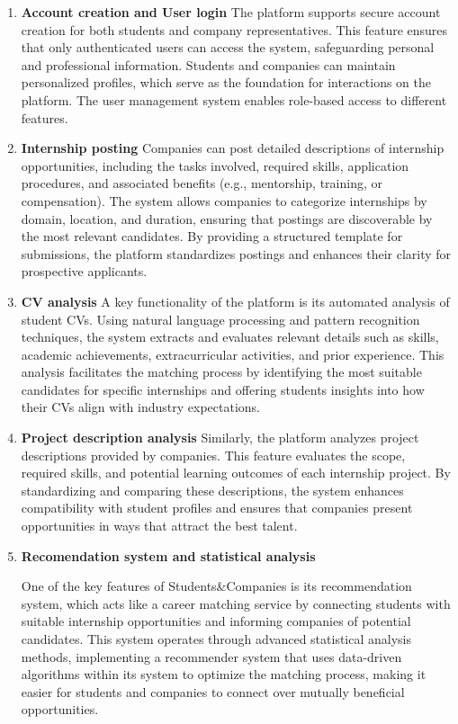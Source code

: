 \begin{enumerate}

\item \textbf{Account creation and User login}
The platform supports secure account creation for both students and company representatives. This feature ensures that only authenticated users can access the system, safeguarding personal and professional information. Students and companies can maintain personalized profiles, which serve as the foundation for interactions on the platform. The user management system enables role-based access to different features.

\item \textbf{Internship posting}
Companies can post detailed descriptions of internship opportunities, including the tasks involved, required skills, application procedures, and associated benefits (e.g., mentorship, training, or compensation). The system allows companies to categorize internships by domain, location, and duration, ensuring that postings are discoverable by the most relevant candidates. By providing a structured template for submissions, the platform standardizes postings and enhances their clarity for prospective applicants.
\item \textbf{CV analysis}
A key functionality of the platform is its automated analysis of student CVs. Using natural language processing and pattern recognition techniques, the system extracts and evaluates relevant details such as skills, academic achievements, extracurricular activities, and prior experience. This analysis facilitates the matching process by identifying the most suitable candidates for specific internships and offering students insights into how their CVs align with industry expectations.
\item \textbf{Project description analysis}
Similarly, the platform analyzes project descriptions provided by companies. This feature evaluates the scope, required skills, and potential learning outcomes of each internship project. By standardizing and comparing these descriptions, the system enhances compatibility with student profiles and ensures that companies present opportunities in ways that attract the best talent.
\item \textbf{Recomendation system and statistical analysis}

One of the key features of Students\&Companies is its recommendation system, which acts like a career matching service by connecting students with suitable internship opportunities and informing companies of potential candidates. This system operates through advanced statistical analysis methods, implementing a recommender system that uses data-driven algorithms within its system to optimize the matching process, making it easier for students and companies to connect over mutually beneficial opportunities. 


\end{enumerate}
